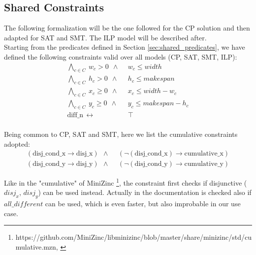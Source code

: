 

\subsection{Shared Constraints} \label{sec:shared_constraints}
    The following formalization will be the one followed for the CP solution and then adapted for
    SAT and SMT. The ILP model will be described after. \\

    Starting from the predicates defined in Section \ref{sec:shared_predicates}, we have defined 
    the following constraints valid over all models (CP, SAT, SMT, ILP):
    \begin{align*}
        \bigwedge_{c \in C}\ w_c > 0\ \    \land\                   &\ w_c \leq width \\
        \bigwedge_{c \in C}\ h_c > 0\ \   \land\                    &\ h_c \leq makespan \\
        \bigwedge_{c \in C}\ x_c \geq 0\ \ \land\                   &\ x_c \leq width - w_c \\
        \bigwedge_{c \in C}\ y_c \geq 0\ \ \land\                   &\ y_c \leq makespan - h_c \\
        \text{diff\_n}\ \ \leftrightarrow\ &\ \top \\
    \end{align*}
    
    Being common to CP, SAT and SMT, here we list the cumulative constraints adopted:
    \begin{align*}
        (\text{disj\_cond\_x} \rightarrow \text{disj\_x})\ \ \land\ &\ (\neg (\text{disj\_cond\_x}) \rightarrow \text{cumulative\_x}) \\
        (\text{disj\_cond\_y} \rightarrow \text{disj\_y})\ \ \land\ &\ (\neg (\text{disj\_cond\_y}) \rightarrow \text{cumulative\_y})
    \end{align*}

    Like in the "cumulative" of MiniZinc \footnote[1]{https://github.com/MiniZinc/libminizinc/blob/master/share/minizinc/std/cumulative.mzn, \label{fn:minizinc_cumulative}}, 
    the constraint first checks if disjunctive ($disj_x$, $disj_y$) can be used instead. 
    Actually in the documentation 
    is checked also if $all\_different$ can be used, which is even faster, but also improbable in our use case. 

